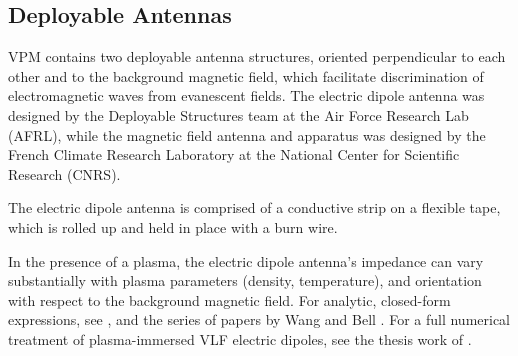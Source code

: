 \subsection{Deployable Antennas}
VPM contains two deployable antenna structures, oriented perpendicular to each other and to the background magnetic field, which facilitate discrimination of electromagnetic waves from evanescent fields. The electric dipole antenna was designed by the Deployable Structures team at the Air Force Research Lab (AFRL), while the magnetic field antenna and apparatus was designed by the French Climate Research Laboratory at the National Center for Scientific Research (CNRS).

The electric dipole antenna is comprised of a conductive strip on a flexible tape, which is rolled up and held in place with a burn wire. 




In the presence of a plasma, the electric dipole antenna's impedance can vary substantially with plasma parameters (density, temperature), and orientation with respect to the background magnetic field. For analytic, closed-form expressions, see \cite{Balmain1964}, and the series of papers by Wang and Bell \citep{Wang1969, Wang_Bell_1972}. For a full numerical treatment of plasma-immersed VLF electric dipoles, see the thesis work of \cite{Chevalier2007}. 


